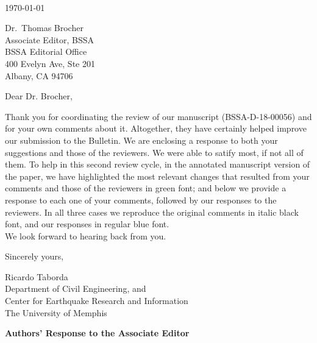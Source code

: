 \documentclass{article}
\begin{document}

\thispagestyle{empty}
\setcounter{page}{0}

~

\vspace{6em}
\noindent\today

\vspace{5em}
\noindent
Dr.~Thomas Brocher\\
Associate Editor, BSSA\\
BSSA Editorial Office\\
400 Evelyn Ave, Ste 201\\
Albany, CA 94706

\vspace{4em}
\noindent
Dear Dr. Brocher,

\vspace{1em}
\noindent
Thank you for coordinating the review of our manuscript (BSSA-D-18-00056) and for your own comments about it. Altogether, they have certainly helped improve our submission to the Bulletin. We are enclosing a response to both your suggestions and those of the reviewers. We were able to satify most, if not all of them. To help in this second review cycle, in the annotated manuscript version of the paper, we have highlighted the most relevant changes that resulted from your comments and those of the reviewers in green font; and below we provide a response to each one of your comments, followed by our responses to the reviewers. In all three cases we reproduce the original comments in italic black font, and our responses in regular blue font.\\

\noindent
We look forward to hearing back from you.

\vspace{2em}
\noindent
Sincerely yours,


\vspace{5em}
\noindent
Ricardo Taborda\\
Department of Civil Engineering, and\\
Center for Earthquake Research and Information\\
The University of Memphis

\newpage
\begin{center}
	\bf
	\large
	Authors' Response to the Associate Editor
\end{center}
\end{document}
